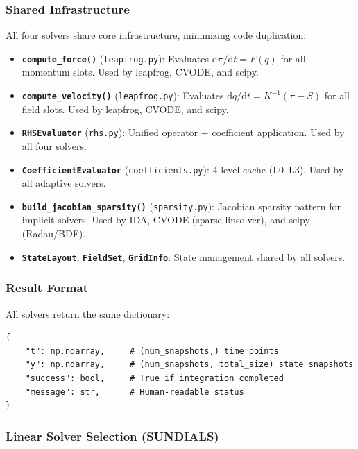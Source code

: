 \subsubsection{Shared Infrastructure}
\label{sec:shared-infrastructure}

All four solvers share core infrastructure, minimizing code duplication:

\begin{itemize}
  \item \textbf{\texttt{compute\_force()}} (\texttt{leapfrog.py}): Evaluates $\mathrm{d}\pi/\mathrm{d}t = F(q)$ for all
    momentum slots. Used by leapfrog, CVODE, and scipy.
  \item \textbf{\texttt{compute\_velocity()}} (\texttt{leapfrog.py}): Evaluates $\mathrm{d}q/\mathrm{d}t = K^{-1}(\pi - S)$
    for all field slots. Used by leapfrog, CVODE, and scipy.
  \item \textbf{\texttt{RHSEvaluator}} (\texttt{rhs.py}): Unified operator + coefficient application.
    Used by all four solvers.
  \item \textbf{\texttt{CoefficientEvaluator}} (\texttt{coefficients.py}): 4-level cache (L0--L3).
    Used by all adaptive solvers.
  \item \textbf{\texttt{build\_jacobian\_sparsity()}} (\texttt{sparsity.py}): Jacobian sparsity pattern
    for implicit solvers. Used by IDA, CVODE (sparse linsolver), and scipy
    (Radau/BDF).
  \item \textbf{\texttt{StateLayout}}, \textbf{\texttt{FieldSet}}, \textbf{\texttt{GridInfo}}: State management shared
    by all solvers.
\end{itemize}

\subsubsection{Result Format}
\label{sec:result-format}

All solvers return the same dictionary:

\begin{lstlisting}[style=python]
{
    "t": np.ndarray,     # (num_snapshots,) time points
    "y": np.ndarray,     # (num_snapshots, total_size) state snapshots
    "success": bool,     # True if integration completed
    "message": str,      # Human-readable status
}
\end{lstlisting}

\subsubsection{Linear Solver Selection (SUNDIALS)}
\label{sec:linear-solver}

